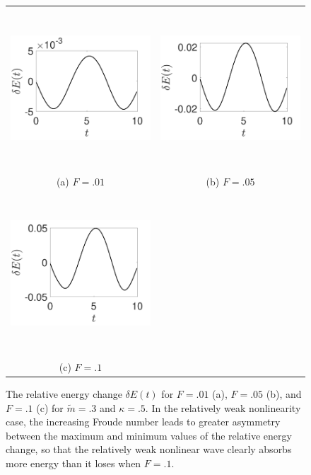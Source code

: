 \documentclass[a4paper,11pt]{article}
\begin{document}
\begin{figure}
\centering
\begin{tabular}{cc}
\includegraphics[width=8cm,height=6cm]{energy_wm_1_modu_pt3} & \includegraphics[width=8cm,height=6cm]{energy_wm_5_modu_pt3} \\
(a) $F=.01$ & (b) $F=.05$\\
 \includegraphics[width=8cm,height=6cm]{energy_wm_10_modu_pt3}\\
 (c) $F=.1$
\end{tabular}
\caption{The relative energy change $\delta E(t)$ for $F=.01$ (a), $F=.05$ (b), and $F=.1$ (c) for $\tilde{m}=.3$ and $\kappa = .5$.  In the relatively weak nonlinearity case, the increasing Froude number leads to greater asymmetry between the maximum and minimum values of the relative energy change, so that the relatively weak nonlinear wave clearly absorbs more energy than it loses when $F=.1$.}
\label{fig:lowsolenergy}
\end{figure}
\end{document}
